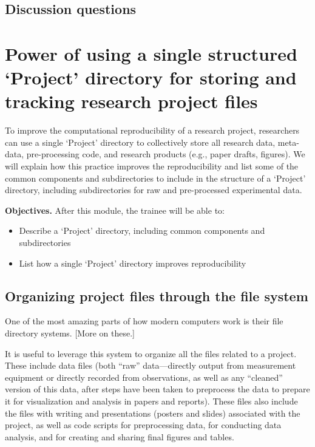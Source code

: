 \documentclass[]{tufte-book}
\providecommand{\tightlist}{%
  \setlength{\itemsep}{0pt}\setlength{\parskip}{0pt}}
\begin{document}
\hypertarget{discussion-questions}{%
\subsection{Discussion questions}\label{discussion-questions}}

\hypertarget{power-of-using-a-single-structured-project-directory-for-storing-and-tracking-research-project-files}{%
\section{Power of using a single structured `Project' directory for storing and tracking research project files}\label{power-of-using-a-single-structured-project-directory-for-storing-and-tracking-research-project-files}}

To improve the computational reproducibility of a research project, researchers
can use a single `Project' directory to collectively store all research data,
meta-data, pre-processing code, and research products (e.g., paper drafts,
figures). We will explain how this practice improves the reproducibility and
list some of the common components and subdirectories to include in the
structure of a `Project' directory, including subdirectories for raw and
pre-processed experimental data.

\textbf{Objectives.} After this module, the trainee will be able to:

\begin{itemize}
\tightlist
\item
  Describe a `Project' directory, including common components and subdirectories
\item
  List how a single `Project' directory improves reproducibility
\end{itemize}

\hypertarget{organizing-project-files-through-the-file-system}{%
\subsection{Organizing project files through the file system}\label{organizing-project-files-through-the-file-system}}

One of the most amazing parts of how modern computers work is their file
directory systems. {[}More on these.{]}

It is useful to leverage this system to organize all the files related to a
project. These include data files (both ``raw'' data---directly output from
measurement equipment or directly recorded from observations, as well as any
``cleaned'' version of this data, after steps have been taken to preprocess the
data to prepare it for visualization and analysis in papers and reports). These
files also include the files with writing and presentations (posters and slides)
associated with the project, as well as code scripts for preprocessing data,
for conducting data analysis, and for creating and sharing final figures and
tables.
\end{document}
